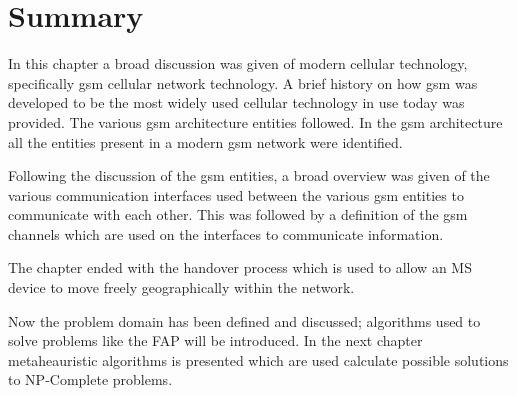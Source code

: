 \section{Summary}
In this chapter a broad discussion was given of modern cellular technology, specifically \gls{gsm} cellular network technology. A brief history on how \gls{gsm} was developed to be the most widely used cellular technology in use today was provided. The various \gls{gsm} architecture entities followed. In the \gls{gsm} architecture all the entities present in a modern \gls{gsm} network were identified.

Following the discussion of the \gls{gsm} entities, a broad overview was given of the various communication interfaces used between the various \gls{gsm} entities to communicate with each other. This was followed by a definition of the \gls{gsm} channels which are used on the interfaces to communicate information.

The chapter ended with the handover process which is used to allow an \gls{MS} device to move freely geographically within the network. 

Now the problem domain has been defined and discussed; algorithms used to solve problems like the \gls{FAP} will be introduced. In the next chapter metaheauristic algorithms is presented which are used calculate possible solutions to NP-Complete problems.
